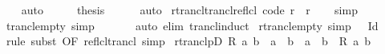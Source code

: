 \begin{isabellebody}
\ \ \isamarkupfalse%
\ auto\isanewline
\ \ \isamarkupfalse%
\ \isamarkupfalse%
\ {\isacharquery}{\kern0pt}thesis\isanewline
\ \ \ \ \isamarkupfalse%
\ auto\isanewline
{}\isamarkupfalse%
%
\endisatagproof
{\isafoldproof}%
%
\isadelimproof
\isanewline
%
\endisadelimproof
\isanewline
{}\isamarkupfalse%
\ rtrancl{\isacharunderscore}{\kern0pt}trancl{\isacharunderscore}{\kern0pt}reflcl\ {\isacharbrackleft}{\kern0pt}code{\isacharbrackright}{\kern0pt}{\isacharcolon}{\kern0pt}\ {\isachardoublequoteopen}r\isactrlsup {\isacharasterisk}{\kern0pt}\ {\isacharequal}{\kern0pt}\ {\isacharparenleft}{\kern0pt}r\isactrlsup {\isacharplus}{\kern0pt}{\isacharparenright}{\kern0pt}\isactrlsup {\isacharequal}{\kern0pt}{\isachardoublequoteclose}\isanewline
%
\isadelimproof
\ \ %
\endisadelimproof
%
\isatagproof
{}\isamarkupfalse%
\ simp%
\endisatagproof
{\isafoldproof}%
%
\isadelimproof
\isanewline
%
\endisadelimproof
\isanewline
{}\isamarkupfalse%
\ trancl{\isacharunderscore}{\kern0pt}empty\ {\isacharbrackleft}{\kern0pt}simp{\isacharbrackright}{\kern0pt}{\isacharcolon}{\kern0pt}\ {\isachardoublequoteopen}{\isacharbraceleft}{\kern0pt}{\isacharbraceright}{\kern0pt}\isactrlsup {\isacharplus}{\kern0pt}\ {\isacharequal}{\kern0pt}\ {\isacharbraceleft}{\kern0pt}{\isacharbraceright}{\kern0pt}{\isachardoublequoteclose}\isanewline
%
\isadelimproof
\ \ %
\endisadelimproof
%
\isatagproof
{}\isamarkupfalse%
\ {\isacharparenleft}{\kern0pt}auto\ elim{\isacharcolon}{\kern0pt}\ trancl{\isacharunderscore}{\kern0pt}induct{\isacharparenright}{\kern0pt}%
\endisatagproof
{\isafoldproof}%
%
\isadelimproof
\isanewline
%
\endisadelimproof
\isanewline
{}\isamarkupfalse%
\ rtrancl{\isacharunderscore}{\kern0pt}empty\ {\isacharbrackleft}{\kern0pt}simp{\isacharbrackright}{\kern0pt}{\isacharcolon}{\kern0pt}\ {\isachardoublequoteopen}{\isacharbraceleft}{\kern0pt}{\isacharbraceright}{\kern0pt}\isactrlsup {\isacharasterisk}{\kern0pt}\ {\isacharequal}{\kern0pt}\ Id{\isachardoublequoteclose}\isanewline
%
\isadelimproof
\ \ %
\endisadelimproof
%
\isatagproof
{}\isamarkupfalse%
\ {\isacharparenleft}{\kern0pt}rule\ subst\ {\isacharbrackleft}{\kern0pt}OF\ reflcl{\isacharunderscore}{\kern0pt}trancl{\isacharbrackright}{\kern0pt}{\isacharparenright}{\kern0pt}\ simp%
\endisatagproof
{\isafoldproof}%
%
\isadelimproof
\isanewline
%
\endisadelimproof
\isanewline
{}\isamarkupfalse%
\ rtranclpD{\isacharcolon}{\kern0pt}\ {\isachardoublequoteopen}R\isactrlsup {\isacharasterisk}{\kern0pt}\isactrlsup {\isacharasterisk}{\kern0pt}\ a\ b\ {\isasymLongrightarrow}\ a\ {\isacharequal}{\kern0pt}\ b\ {\isasymor}\ a\ {\isasymnoteq}\ b\ {\isasymand}\ R\isactrlsup {\isacharplus}{\kern0pt}\isactrlsup {\isacharplus}{\kern0pt}\ a\ b{\isachardoublequoteclose}\isanewline

\end{isabellebody}

